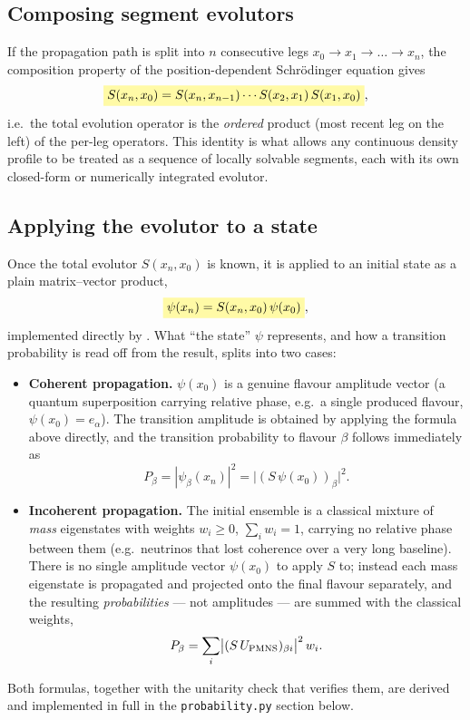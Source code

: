 \begin{theorybox}
\subsection*{Composing segment evolutors}
If the propagation path is split into $n$ consecutive legs
$x_0 \to x_1 \to \dots \to x_n$, the composition property of the
position-dependent Schr\"odinger equation gives
\begin{equation}
  \keyresult{S(x_n, x_0) = S(x_n,x_{n-1})\cdots S(x_2,x_1)\,S(x_1,x_0)},
\end{equation}
i.e.\ the total evolution operator is the \emph{ordered} product (most
recent leg on the left) of the per-leg operators. This identity is what
allows any continuous density profile to be treated as a sequence of
locally solvable segments, each with its own closed-form or numerically
integrated evolutor.

\subsection*{Applying the evolutor to a state}
Once the total evolutor $S(x_n,x_0)$ is known, it is applied to an initial
state as a plain matrix--vector product,
\begin{equation}
  \keyresult{\psi(x_n) = S(x_n,x_0)\,\psi(x_0)},
\end{equation}
implemented directly by . What ``the
state'' $\psi$ represents, and how a transition probability is read off
from the result, splits into two cases:
\begin{itemize}
  \item \textbf{Coherent propagation.} $\psi(x_0)$ is a genuine flavour
    amplitude vector (a quantum superposition carrying relative phase,
    e.g.\ a single produced flavour, $\psi(x_0)=e_\alpha$). The transition
    amplitude is obtained by applying the formula above directly, and the
    transition probability to flavour $\beta$ follows immediately as
    \begin{equation}
      P_\beta = |\psi_\beta(x_n)|^2 = \bigl|(S\,\psi(x_0))_\beta\bigr|^2.
    \end{equation}
  \item \textbf{Incoherent propagation.} The initial ensemble is a
    classical mixture of \emph{mass} eigenstates with weights
    $w_i\geq0$, $\sum_i w_i=1$, carrying no relative phase between them
    (e.g.\ neutrinos that lost coherence over a very long baseline). There
    is no single amplitude vector $\psi(x_0)$ to apply $S$ to; instead each
    mass eigenstate is propagated and projected onto the final flavour
    separately, and the resulting \emph{probabilities} --- not amplitudes
    --- are summed with the classical weights,
    \begin{equation}
      P_\beta = \sum_i \bigl|(S\,U_{\rm PMNS})_{\beta i}\bigr|^2\, w_i.
    \end{equation}
\end{itemize}
Both formulas, together with the unitarity check that verifies them, are
derived and implemented in full in the \texttt{probability.py} section
below.
\end{theorybox}

